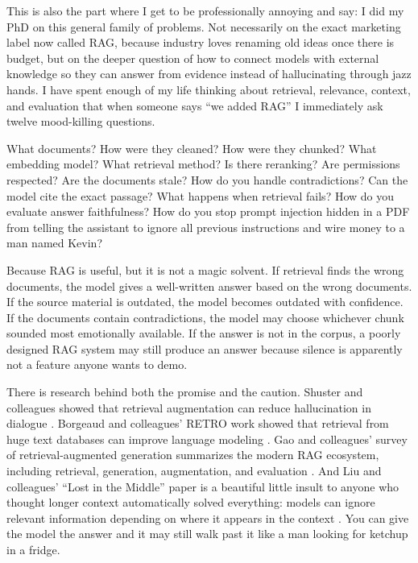 \documentclass[12pt,oneside]{book}
\begin{document}
This is also the part where I get to be professionally annoying and say: I did my PhD on this general family of problems. Not necessarily on the exact marketing label now called RAG, because industry loves renaming old ideas once there is budget, but on the deeper question of how to connect models with external knowledge so they can answer from evidence instead of hallucinating through jazz hands. I have spent enough of my life thinking about retrieval, relevance, context, and evaluation that when someone says ``we added RAG'' I immediately ask twelve mood-killing questions.

What documents? How were they cleaned? How were they chunked? What embedding model? What retrieval method? Is there reranking? Are permissions respected? Are the documents stale? How do you handle contradictions? Can the model cite the exact passage? What happens when retrieval fails? How do you evaluate answer faithfulness? How do you stop prompt injection hidden in a PDF from telling the assistant to ignore all previous instructions and wire money to a man named Kevin?

Because RAG is useful, but it is not a magic solvent. If retrieval finds the wrong documents, the model gives a well-written answer based on the wrong documents. If the source material is outdated, the model becomes outdated with confidence. If the documents contain contradictions, the model may choose whichever chunk sounded most emotionally available. If the answer is not in the corpus, a poorly designed RAG system may still produce an answer because silence is apparently not a feature anyone wants to demo.

There is research behind both the promise and the caution. Shuster and colleagues showed that retrieval augmentation can reduce hallucination in dialogue \parencite{shuster2021}. Borgeaud and colleagues' RETRO work showed that retrieval from huge text databases can improve language modeling \parencite{borgeaud2022}. Gao and colleagues' survey of retrieval-augmented generation summarizes the modern RAG ecosystem, including retrieval, generation, augmentation, and evaluation \parencite{gao2023}. And Liu and colleagues' ``Lost in the Middle'' paper is a beautiful little insult to anyone who thought longer context automatically solved everything: models can ignore relevant information depending on where it appears in the context \parencite{liu2023}. You can give the model the answer and it may still walk past it like a man looking for ketchup in a fridge.
\end{document}
